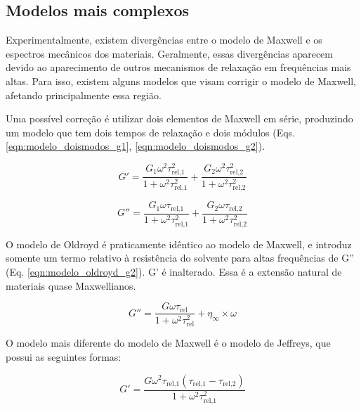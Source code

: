 			\subsection{Modelos mais complexos}
			
			Experimentalmente, existem divergências entre o modelo de Maxwell e os espectros mecânicos dos materiais. Geralmente, essas divergências aparecem devido ao aparecimento de outros  mecanismos de relaxação em frequências mais altas. Para isso, existem alguns modelos que visam corrigir o modelo de Maxwell, afetando principalmente essa região.
			
			Uma possível correção é utilizar dois elementos de Maxwell em série, produzindo um modelo que tem dois tempos de relaxação e dois módulos (Eqs. \ref{eqn:modelo_doismodos_g1}, \ref{eqn:modelo_doismodos_g2}).
			
			\begin{equation}
				G' = \dfrac{ G_1 \omega^2 \tau_{\textrm{rel,1}}^2   }{  1 + \omega^2 \tau_{\textrm{rel,1}}^2      } + \dfrac{ G_2 \omega^2 \tau_{\textrm{rel,2}}^2   }{  1 + \omega^2 \tau_{\textrm{rel,2}}^2      }
			\label{eqn:modelo_doismodos_g1}
			\end{equation}
		
			\begin{equation}
				G'' = \dfrac{  G_1 \omega  \tau_{\textrm{rel,1}}        }{ 1 + \omega^2 \tau_{\textrm{rel,1}}^2 } + \dfrac{  G_2 \omega  \tau_{\textrm{rel,2}}        }{ 1 + \omega^2 \tau_{\textrm{rel,2}}^2 }
			\label{eqn:modelo_doismodos_g2}
			\end{equation}

			
			O modelo de Oldroyd é praticamente idêntico ao modelo de Maxwell, e introduz somente um termo relativo à resistência do solvente para altas frequências de G'' (Eq. \ref{eqn:modelo_oldroyd_g2}). G' é inalterado. Essa é a extensão natural de materiais quase Maxwellianos. %
			
			\begin{equation}
				G'' =\dfrac{  G \omega  \tau_{\textrm{rel}}        }{ 1 + \omega^2 \tau_{\textrm{rel}}^2 } + \eta_{\infty} \times \omega
				\label{eqn:modelo_oldroyd_g2}
			\end{equation}
			
			O modelo mais diferente do modelo de Maxwell é o modelo de Jeffreys, que possui as seguintes formas:
			
			\begin{equation}
				G' = \dfrac{G \omega^{2} \tau_{\textrm{rel,1}} \left(\tau_{\textrm{rel,1}} - \tau_{\textrm{rel,2}}\right)}{1 + \omega^{2} \tau_{\textrm{rel,1}}^{2}}
				\label{eqn:modelo_jeffreys_g1}
			\end{equation}
			
